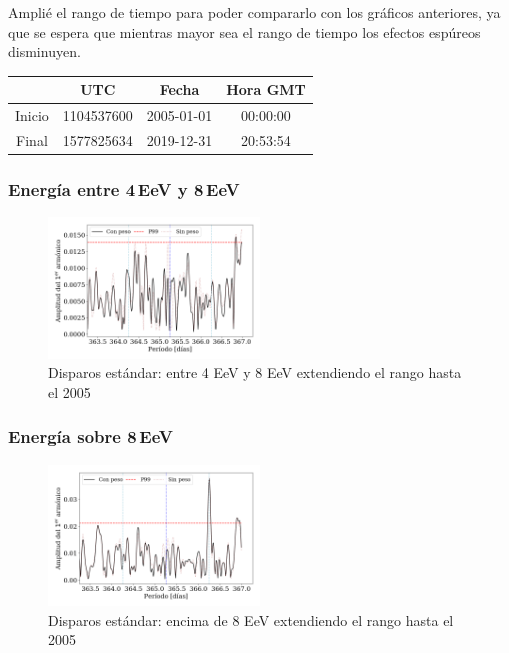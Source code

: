 Amplié el rango de tiempo para poder compararlo con los gráficos anteriores, ya que se espera que mientras mayor sea el rango de tiempo los efectos espúreos disminuyen.

	\begin{table}[H]
	\centering
		\begin{tabular}{c|c|c|c}
	 		& UTC 			& Fecha		 	&  Hora GMT  \\ \hline
	Inicio	& 1104537600	&2005-01-01 	&00:00:00		\\
	Final 	& 1577825634	&2019-12-31 	&20:53:54		\\
		\end{tabular}
	\end{table}


\subsubsection{Energía entre 4\,EeV y 8\,EeV}

\begin{figure}[H]
	\centering
	\includegraphics[width=0.5\textwidth]{Graficos/2019_Main_Array_4_8_EeV_con_vs_sin_peso_extended.png}
	\caption{Disparos estándar: entre 4 EeV y 8 EeV extendiendo el rango hasta el 2005}
	\label{fig:48w_extended}
\end{figure}

\subsubsection{Energía sobre 8\,EeV}


\begin{figure}[H]
	\centering
	\includegraphics[width=0.5\textwidth]{Graficos/2019_Main_Array_8_EeV_con_vs_sin_peso_extended.png}
	\caption{Disparos estándar: encima de 8 EeV extendiendo el rango hasta el 2005}
	\label{fig:8w_extended}
\end{figure}
